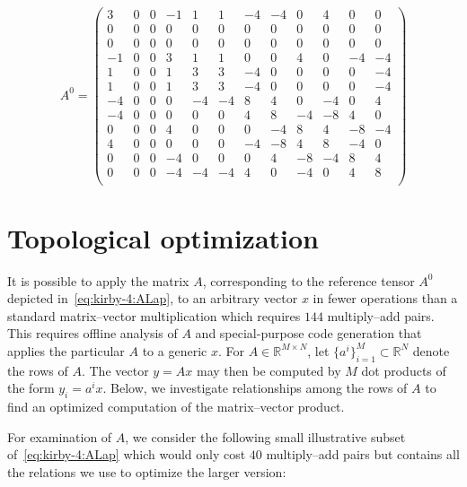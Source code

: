 \begin{equation} \label{eq:kirby-4:ALap}
A^0 =
\left(
\begin{array}{cc|cc|cc|cc|cc|cc}
3 & 0 & 0 & -1 & 1 & 1 & -4 & -4 & 0 & 4 & 0 & 0 \\
0 & 0 & 0 & 0 & 0 & 0 & 0 & 0 & 0 & 0 & 0 & 0 \\ \hline
0 & 0 & 0 & 0 & 0 & 0 & 0 & 0 & 0 & 0 & 0 & 0 \\
-1 & 0 & 0 & 3 & 1 & 1 & 0 & 0 & 4 & 0 & -4 & -4 \\ \hline
1 & 0 & 0 & 1 & 3 & 3 & -4 & 0 & 0 & 0 & 0 & -4 \\
1 & 0 & 0 & 1 & 3 & 3 & -4 & 0 & 0 & 0 & 0 & -4 \\ \hline
-4 & 0 & 0 & 0 & -4 & -4 & 8 & 4 & 0 & -4 & 0 & 4 \\
-4 & 0 & 0 & 0 & 0 & 0 & 4 & 8 & -4 & -8 & 4 & 0 \\ \hline
0 & 0 & 0 & 4 & 0 & 0 & 0 & -4 & 8 & 4 & -8 & -4 \\
4 & 0 & 0 & 0 & 0 & 0 & -4 & -8 & 4 & 8 & -4 & 0 \\ \hline
0 & 0 & 0 & -4 & 0 & 0 & 0 & 4 & -8 & -4 & 8 & 4 \\
0 & 0 & 0 & -4 & -4 & -4 & 4 & 0 & -4 & 0 & 4 & 8 \\
\end{array}
\right)
\end{equation}

\section{Topological optimization}

It is possible to apply the matrix $A$, corresponding to the reference
tensor $A^0$ depicted in~\eqref{eq:kirby-4:ALap}, to an arbitrary
vector $x$ in fewer operations than a standard matrix--vector
multiplication which requires $144$ multiply--add pairs. This requires
offline analysis of $A$ and special-purpose code generation that
applies the particular $A$ to a generic $x$. For $ A \in
\mathbb{R}^{M\times N} $, let $\{ a^i \}_{i=1}^M \subset \mathbb{R}^N$
denote the rows of $ A $.  The vector $ y = Ax $ may then be computed
by $ M $ dot products of the form $ y_i = a^i x $.  Below, we
investigate relationships among the rows of $ A $ to find an optimized
computation of the matrix--vector product.

For examination of $A$, we consider the following small illustrative
subset of~\eqref{eq:kirby-4:ALap} which would only cost $40$
multiply--add pairs but contains all the relations we use to optimize
the larger version:

